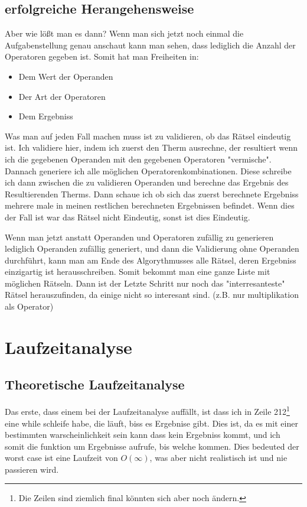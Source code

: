 \documentclass[a4paper,10pt,ngerman]{scrartcl}
\begin{document}
\subsection{erfolgreiche Herangehensweise}

Aber wie lößt man es dann?
\newline
Wenn man sich jetzt noch einmal die Aufgabenstellung genau anschaut kann man sehen, dass lediglich die Anzahl der Operatoren gegeben ist. Somit hat man Freiheiten in:
\begin{itemize}
\item Dem Wert der Operanden
\item Der Art der Operatoren
\item Dem Ergebniss
\end{itemize}
Was man auf jeden Fall machen muss ist zu validieren, ob das Rätsel eindeutig ist. Ich validiere hier, indem ich zuerst den Therm ausrechne, der resultiert wenn ich die gegebenen Operanden mit den gegebenen Operatoren "vermische". Dannach generiere ich alle möglichen Operatorenkombinationen. Diese schreibe ich dann zwischen die zu validieren Operanden und berechne das Ergebnis des Resultierenden Therms. Dann schaue ich ob sich das zuerst berechnete Ergebniss mehrere male in meinen restlichen berechneten Ergebnissen befindet. Wenn dies der Fall ist war das Rätsel nicht Eindeutig, sonst ist dies Eindeutig.

Wenn man jetzt anstatt Operanden und Operatoren zufällig zu generieren lediglich Operanden zufällig generiert, und dann die Validierung ohne Operanden durchführt, kann man am Ende des Algorythmusses alle Rätsel, deren Ergebniss einzigartig ist herausschreiben. Somit bekommt man eine ganze Liste mit möglichen Rätseln. Dann ist der Letzte Schritt nur noch das "interresanteste" Rätsel herauszufinden, da einige nicht so interesant sind. (z.B. nur multiplikation als Operator)

\section{Laufzeitanalyse}

\subsection{Theoretische Laufzeitanalyse}

Das erste, dass einem bei der Laufzeitanalyse auffällt, ist dass ich in Zeile 212\footnote{Die Zeilen sind ziemlich final könnten sich aber noch ändern.} eine while schleife habe, die läuft, biss es Ergebnise gibt. Dies ist, da es mit einer bestimmten warscheinlichkeit sein kann dass kein Ergebniss kommt, und ich somit die funktion um Ergebnisse aufrufe, bis welche kommen. Dies bedeuted der worst case ist eine Laufzeit von $O(\infty)$, was aber nicht realistisch ist und nie passieren wird.
\end{document}
